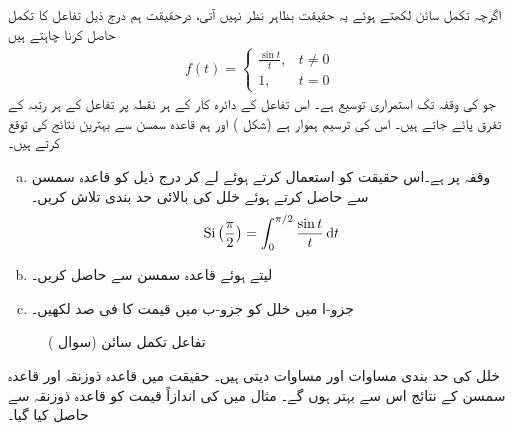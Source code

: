 اگرچہ تکمل سائن لکھتے ہوئے یہ حقیقت بظاہر نظر نہیں آتی،  درحقیقت ہم درج ذیل تفاعل کا تکمل حاصل کرنا چاہتے ہیں
\begin{align*}
f(t)=
\begin{cases}
\frac{\sin t}{t},&t\ne 0\\
1,&t=0
\end{cases}
\end{align*}
جو  کی وقفہ  تک  استمراری توسیع ہے۔ اس تفاعل کے  دائرہ کار کے ہر نقطہ پر تفاعل کے ہر رتبہ کے تفرق پائے جاتے ہیں۔ اس کی ترسیم ہموار ہے (شکل ) اور ہم قاعدہ سمسن سے بہترین نتائج کی  توقع کرتے ہیں۔
\begin{enumerate}[a.]
\item
وقفہ  پر  ہے۔اس حقیقت کو استعمال کرتے ہوئے  لے کر درج ذیل کو قاعدہ سمسن سے حاصل کرتے ہوئے خلل کی بالائی حد بندی تلاش کریں۔
\begin{align*}
\kSi\big(\frac{\pi}{2}\big)=\int_0^{\pi/2}\frac{\sin t}{t}\dif t
\end{align*}
\item
{} لیتے ہوئے قاعدہ سمسن سے  حاصل کریں۔
\item
جزو-ا میں خلل کو جزو-ب میں قیمت کا فی صد لکھیں۔
\end{enumerate}
\begin{figure}
\centering
{}
\caption{تفاعل تکمل  سائن  (سوال )}
\label{شکل_سوال_تکمل_سائن_تکمل}
\end{figure}
خلل کی حد بندی مساوات  اور مساوات  دیتی ہیں۔ حقیقت میں قاعدہ ذوزنقہ اور قاعدہ سمسن کے نتائج اس سے بہتر ہوں گے۔ مثال  میں  کی اندازاً قیمت کو قاعدہ ذوزنقہ سے حاصل کیا گیا۔
